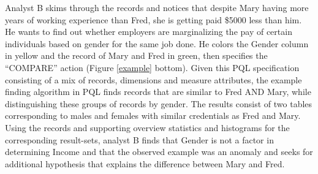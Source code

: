 \documentclass{sig-alternate-05-2015}
\begin{document}
\par Analyst B skims through the records and notices that despite Mary having more years of working experience than Fred, she is getting paid \$5000 less than him. He wants to find out whether employers are marginalizing the pay of certain individuals based on gender for the same job done. He colors the Gender column in yellow and the record of Mary and Fred in green, then specifies the ``COMPARE'' action (Figure \ref{example} bottom). Given this PQL specification consisting of a mix of records, dimensions and measure attributes, the example finding algorithm in PQL finds records that are similar to Fred AND Mary, while distinguishing these groups of records by gender. The results consist of two tables corresponding to males and females with similar credentials as Fred and Mary. Using the records and supporting overview statistics and histograms for the corresponding result-sets, analyst B finds that Gender is not a factor in determining Income and that the observed example was an anomaly and seeks for additional hypothesis that explains the difference between Mary and Fred.
\end{document}
